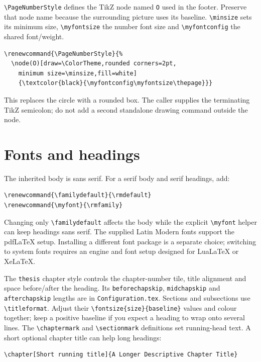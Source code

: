 \verb|\PageNumberStyle| defines the TikZ node named \texttt{O} used in the
footer. Preserve that node name because the surrounding picture uses its
baseline. \verb|\minsize| sets its minimum size, \verb|\myfontsize| the number
font size and \verb|\myfontconfig| the shared font/weight.
\begin{lstlisting}
\renewcommand{\PageNumberStyle}{%
  \node(O)[draw=\ColorTheme,rounded corners=2pt,
    minimum size=\minsize,fill=white]
    {\textcolor{black}{\myfontconfig\myfontsize\thepage}}}
\end{lstlisting}
This replaces the circle with a rounded box. The caller supplies the terminating
TikZ semicolon; do not add a second standalone drawing command outside the node.

\section{Fonts and headings}
The inherited body is sans serif. For a serif body and serif headings, add:
\begin{lstlisting}
\renewcommand{\familydefault}{\rmdefault}
\renewcommand{\myfont}{\rmfamily}
\end{lstlisting}
Changing only \verb|\familydefault| affects the body while the explicit
\verb|\myfont| helper can keep headings sans serif. The supplied Latin Modern
fonts support the pdfLaTeX setup. Installing a different font package is a
separate choice; switching to system fonts requires an engine and font setup
designed for LuaLaTeX or XeLaTeX.

The \texttt{thesis} chapter style controls the chapter-number tile, title
alignment and space before/after the heading. Its \texttt{beforechapskip},
\texttt{midchapskip} and \texttt{afterchapskip} lengths are in
\texttt{Configuration.tex}. Sections and subsections use \verb|\titleformat|.
Adjust their \verb|\fontsize{size}{baseline}| values and colour together; keep
a positive baseline if you expect a heading to wrap onto several lines.
The \verb|\chaptermark| and \verb|\sectionmark| definitions set running-head
text. A short optional chapter title can help long headings:
\begin{lstlisting}
\chapter[Short running title]{A Longer Descriptive Chapter Title}
\end{lstlisting}

